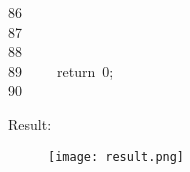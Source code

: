\documentclass{article}
\newcommand{\hlstd}[1]{\textcolor[rgb]{0.2,0.2,0.2}{#1}}
\newcommand{\hlnum}[1]{\textcolor[rgb]{0.06,0.58,0.63}{#1}}
\newcommand{\hlopt}[1]{\textcolor[rgb]{0.2,0.2,0.2}{#1}}
\newcommand{\hllin}[1]{\textcolor[rgb]{0.59,0.59,0.59}{#1}}
\newcommand{\hlkwa}[1]{\textcolor[rgb]{0.23,0.42,0.78}{#1}}
\begin{document}
	\hllin{86\ }\hlstd{}\hlstd{\ \ \ \ \ \ \ \ }\hlstd{}\hlopt{\usebox{\hlboxclosebrace}}\\
	\hllin{87\ }\hlstd{}\hlstd{\ \ \ \ }\hlstd{}\hlopt{\usebox{\hlboxclosebrace}}\\
	\hllin{88\ }\hlstd{}\Righttorque\\
	\hllin{89\ }\hlstd{}\hlstd{\ \ \ \ }\hlstd{}\hlkwa{return\ }\hlstd{}\hlnum{0}\hlstd{}\hlopt{;}\\
	\hllin{90\ }\hlstd{}\hlopt{\usebox{\hlboxclosebrace}}\hlstd{}\\
	\mbox{}
	\normalfont
	\normalsize
	
	\newpage
	Result:\\
	\begin{figure}
		\centering
		\texttt{[image: result.png]}
	\end{figure}
\end{document}

